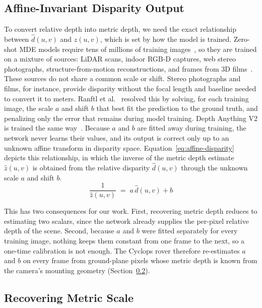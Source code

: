 \subsection{Affine-Invariant Disparity Output}
\label{sec:alignment}
To convert relative depth into metric depth, we need the exact relationship between
$\hat{d}(u,v)$ and $z(u,v)$, which is set by how the model is trained. Zero-shot MDE models
require tens of millions of training images~\cite{ViT,DepthAnythingV2}, so they are trained on a
mixture of sources: LiDAR scans, indoor RGB-D captures, web stereo photographs,
structure-from-motion reconstructions, and frames from 3D films~\cite{MiDaS,DPT}. These sources do
not share a common scale or shift. Stereo photographs and films, for instance, provide disparity
without the focal length and baseline needed to convert it to meters. Ranftl et
al.~\cite{MiDaS} resolved this by solving, for each training image, the scale $a$ and shift $b$
that best fit the prediction to the ground truth, and penalizing only the error that remains during model training.
Depth Anything V2 is trained the same way~\cite{DepthAnythingV2}. Because $a$ and $b$ are fitted
away during training, the network never learns their values, and its output is correct only up to
an unknown affine transform in disparity space. Equation~\ref{eq:affine-disparity} depicts this
relationship, in which the inverse of the metric depth estimate $\hat{z}(u,v)$ is obtained from the
relative disparity $\hat{d}(u,v)$ through the unknown scale $a$ and shift $b$.
\begin{equation}
  \frac{1}{\hat{z}(u,v)} \;=\; a\,\hat{d}(u,v) + b
  \label{eq:affine-disparity}
\end{equation}

This has two consequences for our work. First, recovering metric depth reduces to estimating two
scalars, since the network already supplies the per-pixel relative depth of the scene. Second, because
$a$ and $b$ were fitted separately for every training image, nothing keeps them constant from one
frame to the next, so a one-time calibration is not enough. The Cyclops rover therefore
re-estimates $a$ and $b$ on every frame from ground-plane pixels whose metric depth is known from
the camera's mounting geometry (Section~\ref{sec:metric-scale}).


\subsection{Recovering Metric Scale}
\label{sec:metric-scale}

